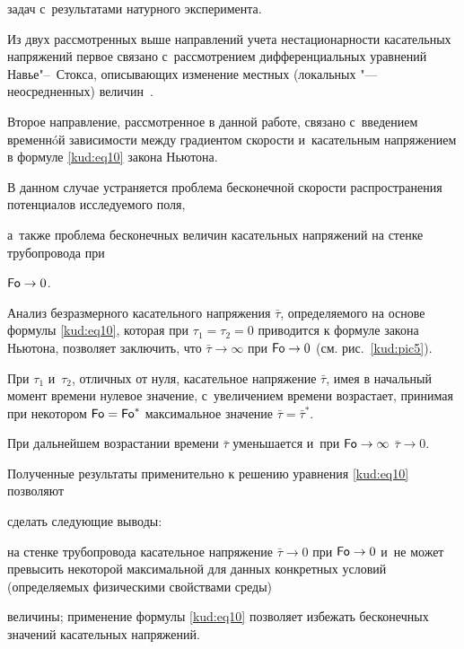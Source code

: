 задач с~результатами натурного эксперимента. 

Из двух рассмотренных выше направлений учета нестационарности касательных напряжений первое связано с~рассмотрением дифференциальных уравнений Навье"--~Стокса, описывающих изменение местных (локальных "--- неосредненных) величин~\cite{kud:bib15}. 

Второе направление, рассмотренное в данной работе, связано с~введением временн\'{o}й зависимости между градиентом скорости и~касательным напряжением в формуле \eqref{kud:eq10} закона Ньютона. 

В данном случае устраняется проблема бесконечной скорости распространения потенциалов исследуемого поля,

а~также проблема бесконечных величин касательных напряжений на стенке трубопровода при

$\operatorname{\sf Fo}\to 0$.



Анализ безразмерного касательного напряжения $ {\bar \tau}$, определяемого на основе формулы \eqref{kud:eq10}, которая при $ \tau_1 = \tau_2 =0$ приводится к формуле закона Ньютона, позволяет заключить, что $\bar \tau \to \infty$ при $\operatorname{\sf Fo}\to 0$ (см. рис.~\ref{kud:pic5}). 

При $ \tau_1 $ и~$ \tau_2 $, отличных от нуля, касательное напряжение $ {\bar \tau}$, имея в начальный момент времени нулевое значение, с~увеличением времени возрастает, принимая при некотором $\operatorname{\sf Fo}=\operatorname{\sf Fo}^\ast $ максимальное значение $ {\bar \tau}= {\bar \tau^\ast}$. 

При дальнейшем возрастании времени $ {\bar \tau}$ уменьшается и~при $\operatorname{\sf Fo} \to \infty$ $\bar \tau \to 0$. 

Полученные результаты применительно к решению уравнения \eqref{kud:eq10} позволяют

сделать следующие выводы: 

на стенке трубопровода касательное напряжение  $\bar \tau \to 0$ при $\operatorname{\sf Fo} \to 0$  и~не может превысить некоторой максимальной для данных конкретных условий (определяемых физическими свойствами среды)

величины; применение формулы \eqref{kud:eq10} позволяет избежать бесконечных значений касательных напряжений.



